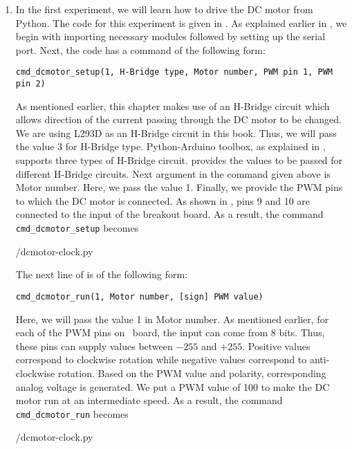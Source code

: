 \begin{enumerate}
  \item In the first experiment, we will learn how to drive the DC motor
        from Python. The code for this experiment is
        given in  . As explained earlier in , we begin with
        importing necessary modules followed by setting up the serial port.
        Next, the code has a command of the following form:
        \begin{lstlisting}[style=nonumbers]
              cmd_dcmotor_setup(1, H-Bridge type, Motor number, PWM pin 1, PWM pin 2)
        \end{lstlisting}
        As mentioned earlier, this chapter makes use of an H-Bridge circuit which
        allows direction of the current passing through the DC motor to be changed.
        We are using L293D as an H-Bridge circuit in this book. Thus, we will pass the value 3 for
        H-Bridge type. Python-Arduino toolbox, as explained in ,
        supports three types of H-Bridge circuit. 
        provides the values to be passed for different H-Bridge circuits.
        Next argument in the command given above is Motor number. Here, we pass the value 1.
        Finally, we provide the PWM pins to which the DC motor is connected. As
        shown in , pins 9 and 10 are connected to the
        input of the breakout board. As a result, the command {\tt cmd\_dcmotor\_setup} becomes
        
        {\LocDCMpycode/dcmotor-clock.py}

        The next line of  is of the following form:
        \begin{lstlisting}[style=nonumbers]
          cmd_dcmotor_run(1, Motor number, [sign] PWM value)
        \end{lstlisting}
        Here, we will pass the value 1 in Motor number.  As mentioned earlier,
        for each of the PWM pins on \arduino\ board, the input can come from 8 bits.
        Thus, these pins can supply values between $- 255$ and $+ 255$. Positive values correspond to clockwise
        rotation while negative values correspond to anti-clockwise rotation. Based on the PWM value and polarity,
        corresponding analog voltage is generated.
        We put a PWM value of 100 to make the DC motor run at an intermediate speed.
        As a result, the command {\tt cmd\_dcmotor\_run} becomes
        
        {\LocDCMpycode/dcmotor-clock.py}


\end{enumerate}
